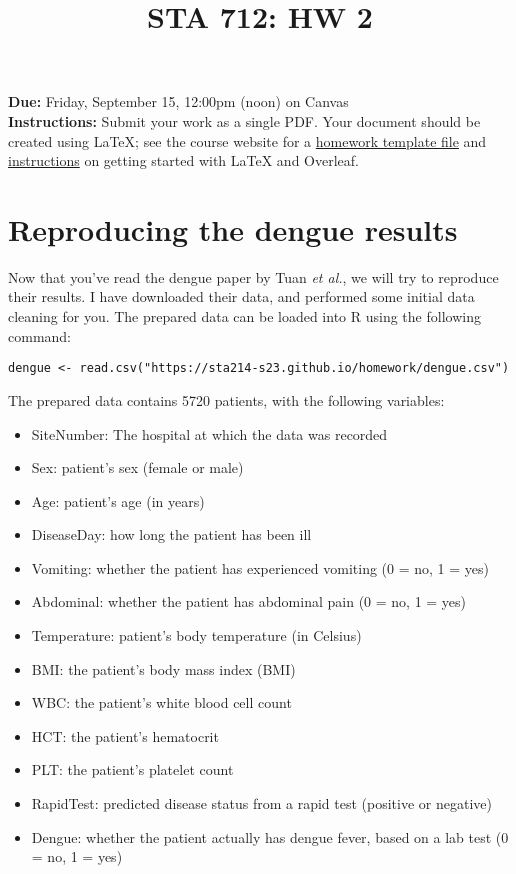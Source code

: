 \documentclass[11pt]{article}
\title{STA 712: HW 2}
\author{}
\date{}
\begin{document}
\maketitle

\noindent \textbf{Due:} Friday, September 15, 12:00pm (noon) on Canvas\\

\noindent \textbf{Instructions:} Submit your work as a single PDF. Your document should be created using LaTeX; see the course website for a \href{https://sta712-f23.github.io/homework/hw_template.tex}{homework template file} and \href{https://sta712-f23.github.io/homework/latex_instructions/}{instructions} on getting started with LaTeX and Overleaf.

\section{Reproducing the dengue results}

Now that you've read the dengue paper by Tuan \textit{et al.}, we will try to reproduce their results. I have downloaded their data, and performed some initial data cleaning for you. The prepared data can be loaded into R using the following command:

\begin{verbatim}
dengue <- read.csv("https://sta214-s23.github.io/homework/dengue.csv")
\end{verbatim}

The prepared data contains 5720 patients, with the following variables:

\begin{itemize}
\item SiteNumber: The hospital at which the data was recorded 
\item Sex: patient's sex (female or male)
\item Age: patient's age (in years)
\item DiseaseDay: how long the patient has been ill
\item Vomiting: whether the patient has experienced vomiting (0 = no, 1 = yes)
\item Abdominal: whether the patient has abdominal pain (0 = no, 1 = yes)
\item Temperature: patient's body temperature (in Celsius)
\item BMI: the patient's body mass index (BMI)
\item WBC: the patient's white blood cell count
\item HCT: the patient's hematocrit
\item PLT: the patient's platelet count
\item RapidTest: predicted disease status from a rapid test (positive or negative)
\item Dengue: whether the patient actually has dengue fever, based on a lab test (0 = no, 1 = yes)
\end{itemize}
\end{document}
